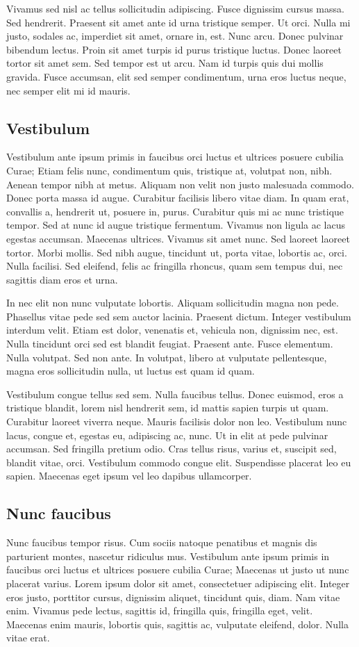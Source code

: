 \documentclass[12pt]{article}
\begin{document}
Vivamus sed nisl ac tellus sollicitudin adipiscing. Fusce dignissim cursus massa. Sed hendrerit. Praesent sit amet ante id urna tristique semper. Ut orci. Nulla mi justo, sodales ac, imperdiet sit amet, ornare in, est. Nunc arcu. Donec pulvinar bibendum lectus. Proin sit amet turpis id purus tristique luctus. Donec laoreet tortor sit amet sem. Sed tempor est ut arcu. Nam id turpis quis dui mollis gravida. Fusce accumsan, elit sed semper condimentum, urna eros luctus neque, nec semper elit mi id mauris.

\subsection{Vestibulum}
Vestibulum ante ipsum primis in faucibus orci luctus et ultrices posuere cubilia Curae; Etiam felis nunc, condimentum quis, tristique at, volutpat non, nibh. Aenean tempor nibh at metus. Aliquam non velit non justo malesuada commodo. Donec porta massa id augue. Curabitur facilisis libero vitae diam. In quam erat, convallis a, hendrerit ut, posuere in, purus. Curabitur quis mi ac nunc tristique tempor. Sed at nunc id augue tristique fermentum. Vivamus non ligula ac lacus egestas accumsan. Maecenas ultrices. Vivamus sit amet nunc. Sed laoreet laoreet tortor. Morbi mollis. Sed nibh augue, tincidunt ut, porta vitae, lobortis ac, orci. Nulla facilisi. Sed eleifend, felis ac fringilla rhoncus, quam sem tempus dui, nec sagittis diam eros et urna.

In nec elit non nunc vulputate lobortis. Aliquam sollicitudin magna non pede. Phasellus vitae pede sed sem auctor lacinia. Praesent dictum. Integer vestibulum interdum velit. Etiam est dolor, venenatis et, vehicula non, dignissim nec, est. Nulla tincidunt orci sed est blandit feugiat. Praesent ante. Fusce elementum. Nulla volutpat. Sed non ante. In volutpat, libero at vulputate pellentesque, magna eros sollicitudin nulla, ut luctus est quam id quam.

Vestibulum congue tellus sed sem. Nulla faucibus tellus. Donec euismod, eros a tristique blandit, lorem nisl hendrerit sem, id mattis sapien turpis ut quam. Curabitur laoreet viverra neque. Mauris facilisis dolor non leo. Vestibulum nunc lacus, congue et, egestas eu, adipiscing ac, nunc. Ut in elit at pede pulvinar accumsan. Sed fringilla pretium odio. Cras tellus risus, varius et, suscipit sed, blandit vitae, orci. Vestibulum commodo congue elit. Suspendisse placerat leo eu sapien. Maecenas eget ipsum vel leo dapibus ullamcorper.

\subsection{Nunc faucibus}
Nunc faucibus tempor risus. Cum sociis natoque penatibus et magnis dis parturient montes, nascetur ridiculus mus. Vestibulum ante ipsum primis in faucibus orci luctus et ultrices posuere cubilia Curae; Maecenas ut justo ut nunc placerat varius. Lorem ipsum dolor sit amet, consectetuer adipiscing elit. Integer eros justo, porttitor cursus, dignissim aliquet, tincidunt quis, diam. Nam vitae enim. Vivamus pede lectus, sagittis id, fringilla quis, fringilla eget, velit. Maecenas enim mauris, lobortis quis, sagittis ac, vulputate eleifend, dolor. Nulla vitae erat.
\end{document}
